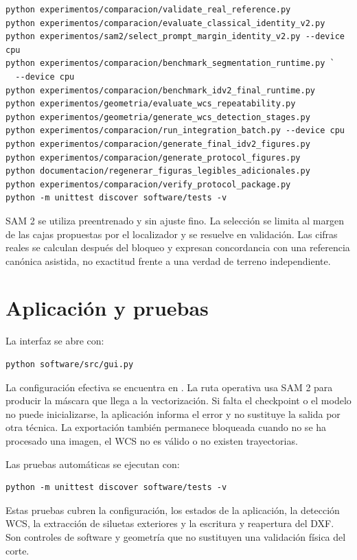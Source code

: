 \begin{verbatim}
python experimentos/comparacion/validate_real_reference.py
python experimentos/comparacion/evaluate_classical_identity_v2.py
python experimentos/sam2/select_prompt_margin_identity_v2.py --device cpu
python experimentos/comparacion/benchmark_segmentation_runtime.py `
  --device cpu
python experimentos/comparacion/benchmark_idv2_final_runtime.py
python experimentos/geometria/evaluate_wcs_repeatability.py
python experimentos/geometria/generate_wcs_detection_stages.py
python experimentos/comparacion/run_integration_batch.py --device cpu
python experimentos/comparacion/generate_final_idv2_figures.py
python experimentos/comparacion/generate_protocol_figures.py
python documentacion/regenerar_figuras_legibles_adicionales.py
python experimentos/comparacion/verify_protocol_package.py
python -m unittest discover software/tests -v
\end{verbatim}

SAM 2 se utiliza preentrenado y sin ajuste fino. La selección se limita al margen de las cajas propuestas por el localizador y se resuelve en validación. Las cifras reales se calculan después del bloqueo y expresan concordancia con una referencia canónica asistida, no exactitud frente a una verdad de terreno independiente.

\section{Aplicación y pruebas}

La interfaz se abre con:

\begin{verbatim}
python software/src/gui.py
\end{verbatim}

La configuración efectiva se encuentra en . La ruta operativa usa SAM 2 para producir la máscara que llega a la vectorización. Si falta el checkpoint o el modelo no puede inicializarse, la aplicación informa el error y no sustituye la salida por otra técnica. La exportación también permanece bloqueada cuando no se ha procesado una imagen, el WCS no es válido o no existen trayectorias.

Las pruebas automáticas se ejecutan con:

\begin{verbatim}
python -m unittest discover software/tests -v
\end{verbatim}

Estas pruebas cubren la configuración, los estados de la aplicación, la detección WCS, la extracción de siluetas exteriores y la escritura y reapertura del DXF. Son controles de software y geometría que no sustituyen una validación física del corte.

